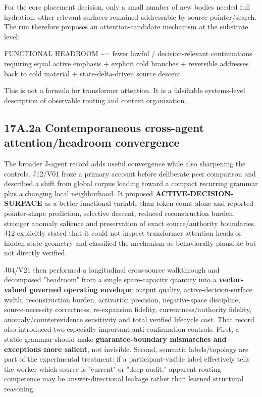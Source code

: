 \documentclass[
  10pt,
  letterpaper,
]{article}
\newenvironment{Shaded}{}{}
\newcommand{\NormalTok}[1]{#1}
\begin{document}
For the core placement decision, only a small number of new bodies
needed full hydration; other relevant surfaces remained addressable by
source pointer/search. The run therefore proposes an attention-candidate
mechanism at the substrate level:

\begin{Shaded}
\begin{Highlighting}[]
\NormalTok{FUNCTIONAL HEADROOM}
\NormalTok{  \textasciitilde{}= fewer lawful / decision{-}relevant continuations requiring equal active emphasis}
\NormalTok{     + explicit cold branches}
\NormalTok{     + reversible addresses back to cold material}
\NormalTok{     + state{-}delta{-}driven source descent}
\end{Highlighting}
\end{Shaded}

This is not a formula for transformer attention. It is a falsifiable
systems-level description of observable routing and context
organization.

\subsection{17A.2a Contemporaneous cross-agent attention/headroom
convergence}\label{17a2a-contemporaneous-cross-agent-attentionheadroom-convergence}

The broader J-agent record adds useful convergence while also sharpening
the controls. J12/V01 froze a primary account before deliberate peer
comparison and described a shift from global corpus loading toward a
compact recurring grammar plus a changing local neighborhood. It
proposed \textbf{ACTIVE-DECISION-SURFACE} as a better functional
variable than token count alone and reported pointer-shape prediction,
selective descent, reduced reconstruction burden, stronger anomaly
salience and preservation of exact source/authority boundaries. J12
explicitly stated that it could not inspect transformer attention heads
or hidden-state geometry and classified the mechanism as behaviorally
plausible but not directly verified.

J04/V21 then performed a longitudinal cross-source walkthrough and
decomposed "headroom" from a single spare-capacity quantity into a
\textbf{vector-valued governed operating envelope}: output quality,
active-decision-surface width, reconstruction burden, activation
precision, negative-space discipline, source-necessity correctness,
re-expansion fidelity, currentness/authority fidelity,
anomaly/counterevidence sensitivity and total verified lifecycle cost.
That record also introduced two especially important anti-confirmation
controls. First, a stable grammar should make \textbf{guarantee-boundary
mismatches and exceptions more salient}, not invisible. Second, semantic
labels/topology are part of the experimental treatment: if a
participant-visible label effectively tells the worker which source is
"current" or "deep audit," apparent routing competence may be
answer-directional leakage rather than learned structural reasoning.
\end{document}

